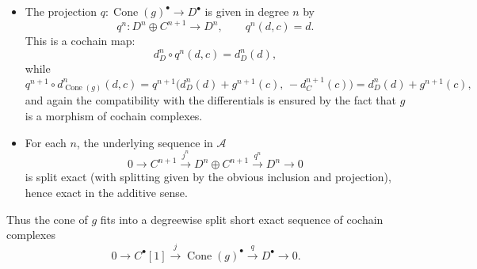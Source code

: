 \begin{lemma}
\begin{enumerate}
\begin{itemize}
        \item The projection $q : \operatorname{Cone}(g)^\bullet \to D^\bullet$ is given in degree $n$ by
        \[
            q^n : D^n \oplus C^{n+1} \longrightarrow D^n, \qquad
            q^n(d,c) = d.
        \]
        This is a cochain map:
        \[
            d_D^n \circ q^n(d,c)
            =
            d_D^n(d),
        \]
        while
        \[
            q^{n+1}\circ d_{\operatorname{Cone}(g)}^n(d,c)
            =
            q^{n+1}\bigl(d_D^n(d) + g^{n+1}(c),\, -d_C^{n+1}(c)\bigr)
            =
            d_D^n(d) + g^{n+1}(c),
        \]
        and again the compatibility with the differentials is ensured by the fact that $g$ is a morphism of cochain complexes.

        \item For each $n$, the underlying sequence in $\mathcal{A}$
        \[
            0 \longrightarrow C^{n+1}
            \xrightarrow{j^n}
            D^n \oplus C^{n+1}
            \xrightarrow{q^n}
            D^n
            \longrightarrow 0
        \]
        is split exact (with splitting given by the obvious inclusion and projection),
        hence exact in the additive sense.
        \end{itemize}

        Thus the cone of $g$ fits into a degreewise split short exact sequence of cochain complexes
        \[
        0 \longrightarrow C^\bullet[1]
        \xrightarrow{j}
        \operatorname{Cone}(g)^\bullet
        \xrightarrow{q}
        D^\bullet
        \longrightarrow 0.
        \]
    \end{enumerate}
\end{lemma}
